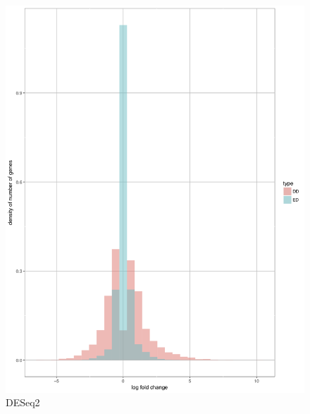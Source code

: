 \documentclass[11pt]{amsart}
\begin{document}
\begin{figure}[H]
  \includegraphics[width=\linewidth]{DEC_NPC_des.png}
  \caption{DESeq2}\label{fig:DESeq2}
\endminipage
\end{figure}
\end{document}
